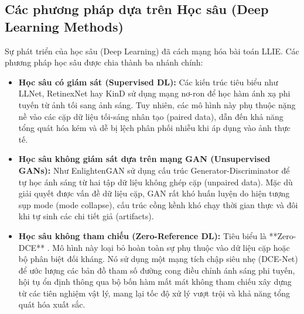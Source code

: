 \documentclass[a4paper]{article}
\begin{document}
\subsection{Các phương pháp dựa trên Học sâu (Deep Learning Methods)}
Sự phát triển của học sâu (Deep Learning) đã cách mạng hóa bài toán LLIE. Các phương pháp học sâu được chia thành ba nhánh chính:
\begin{itemize}
    \item \textbf{Học sâu có giám sát (Supervised DL):} Các kiến trúc tiêu biểu như LLNet, RetinexNet hay KinD sử dụng mạng nơ-ron để học hàm ánh xạ phi tuyến từ ảnh tối sang ảnh sáng. Tuy nhiên, các mô hình này phụ thuộc nặng nề vào các cặp dữ liệu tối-sáng nhân tạo (paired data), dẫn đến khả năng tổng quát hóa kém và dễ bị lệch phân phối nhiễu khi áp dụng vào ảnh thực tế.
    \item \textbf{Học sâu không giám sát dựa trên mạng GAN (Unsupervised GANs):} Như EnlightenGAN sử dụng cấu trúc Generator-Discriminator để tự học ánh sáng từ hai tập dữ liệu không ghép cặp (unpaired data). Mặc dù giải quyết được vấn đề dữ liệu cặp, GAN rất khó huấn luyện do hiện tượng sụp mode (mode collapse), cấu trúc cồng kềnh khó chạy thời gian thực và đôi khi tự sinh các chi tiết giả (artifacts).
    \item \textbf{Học sâu không tham chiếu (Zero-Reference DL):} Tiêu biểu là **Zero-DCE** \cite{zero-dce}. Mô hình này loại bỏ hoàn toàn sự phụ thuộc vào dữ liệu cặp hoặc bộ phân biệt đối kháng. Nó sử dụng một mạng tích chập siêu nhẹ (DCE-Net) để ước lượng các bản đồ tham số đường cong điều chỉnh ánh sáng phi tuyến, hội tụ ổn định thông qua bộ bốn hàm mất mát không tham chiếu xây dựng từ các tiên nghiệm vật lý, mang lại tốc độ xử lý vượt trội và khả năng tổng quát hóa xuất sắc.
\end{itemize}

\begin{table}[H]
\centering
\caption{Bảng so sánh tổng quan các nhóm phương pháp tăng cường ảnh thiếu sáng}
\label{tab:comparison_methods}
\setlength{\tabcolsep}{5pt}
\end{table}
\end{document}
